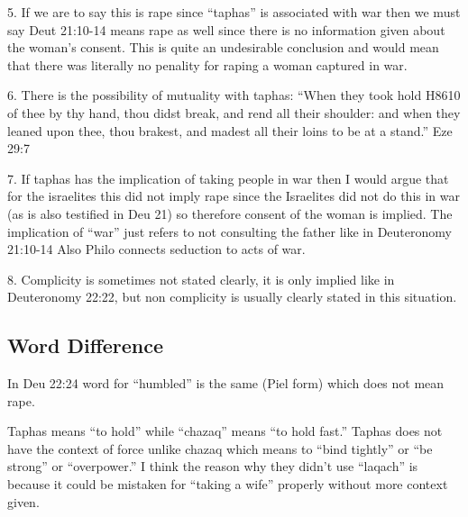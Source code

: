 \documentclass[11pt]{article}
\begin{document}
5. If we are to say this is rape since “taphas” is associated with war then we must say Deut 21:10-14 means rape as well since there is no information given about the woman’s consent. This is quite an undesirable conclusion and would mean that there was literally no penality for raping a woman captured in war. 

6. There is the possibility of mutuality with taphas: “When they took hold H8610 of thee by thy hand, thou didst break, and rend all their shoulder: and when they leaned upon thee, thou brakest, and madest all their loins to be at a stand.” Eze 29:7

7. If taphas has the implication of taking people in war then I would argue that for the israelites this did not imply rape since the Israelites did not do this in war (as is also testified in Deu 21) so therefore consent of the woman is implied. The implication of “war” just refers to not consulting the father like in Deuteronomy 21:10-14 Also Philo connects seduction to acts of war.

8. Complicity is sometimes not stated clearly, it is only implied like in Deuteronomy 22:22, but non complicity is usually clearly stated in this situation.

\subsection{Word Difference}

In Deu 22:24 word for “humbled” is the same (Piel form) which does not mean rape.

Taphas means “to hold” while “chazaq” means “to hold fast.” Taphas does not have the context of force unlike chazaq which means to “bind tightly” or “be strong” or “overpower.” I think the reason why they didn’t use “laqach” is because it could be mistaken for “taking a wife” properly without more context given.  
\end{document}
